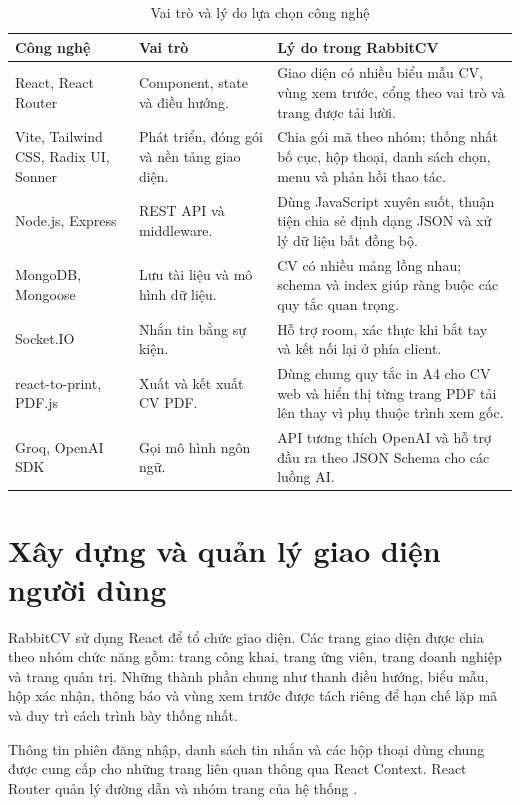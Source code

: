 \begin{table}[H]
    \centering
    \small
    \begin{tabularx}{\textwidth}{|p{}|p{}|Y|} \hline
        \textbf{Công nghệ} & \textbf{Vai trò} & \textbf{Lý do trong RabbitCV} \\ \hline
        React, React Router & Component, state và điều hướng. & Giao diện có nhiều biểu mẫu CV, vùng xem trước, cổng theo vai trò và trang được tải lười. \\ \hline
        Vite, Tailwind CSS, Radix UI, Sonner & Phát triển, đóng gói và nền tảng giao diện. & Chia gói mã theo nhóm; thống nhất bố cục, hộp thoại, danh sách chọn, menu và phản hồi thao tác. \\ \hline
        Node.js, Express & REST API và middleware. & Dùng JavaScript xuyên suốt, thuận tiện chia sẻ định dạng JSON và xử lý dữ liệu bất đồng bộ. \\ \hline
        MongoDB, Mongoose & Lưu tài liệu và mô hình dữ liệu. & CV có nhiều mảng lồng nhau; schema và index giúp ràng buộc các quy tắc quan trọng. \\ \hline
        Socket.IO & Nhắn tin bằng sự kiện. & Hỗ trợ room, xác thực khi bắt tay và kết nối lại ở phía client. \\ \hline
        react-to-print, PDF.js & Xuất và kết xuất CV PDF. & Dùng chung quy tắc in A4 cho CV web và hiển thị từng trang PDF tải lên thay vì phụ thuộc trình xem gốc. \\ \hline
        Groq, OpenAI SDK & Gọi mô hình ngôn ngữ. & API tương thích OpenAI và hỗ trợ đầu ra theo JSON Schema cho các luồng AI. \\ \hline
    \end{tabularx}
    \caption{Vai trò và lý do lựa chọn công nghệ}
    \label{tab:technology-choice}
\end{table}

\section{Xây dựng và quản lý giao diện người dùng}

RabbitCV sử dụng React để tổ chức giao diện. Các trang giao diện được chia theo nhóm chức năng gồm: trang công khai, trang ứng viên, trang doanh nghiệp và trang quản trị.
Những thành phần chung như thanh điều hướng, biểu mẫu, hộp xác nhận, thông báo và vùng xem trước được tách riêng để hạn chế lặp mã và duy trì cách trình bày thống nhất.

Thông tin phiên đăng nhập, danh sách tin nhắn và các hộp thoại dùng chung được cung cấp cho những trang liên quan thông qua React Context. React Router quản lý đường dẫn và nhóm trang của hệ thống \cite{reactrouterdocs}.

